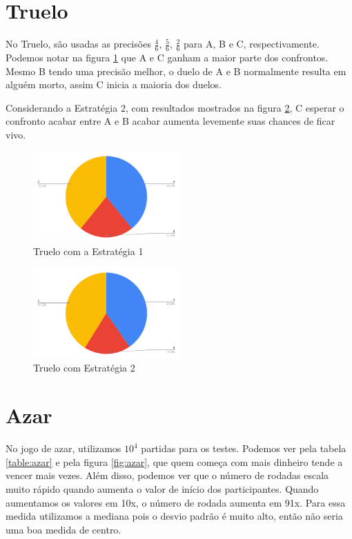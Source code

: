 \documentclass{report}
\begin{document}
\section{Truelo}

No Truelo, são usadas as precisões $\frac{4}{6}$, $\frac{5}{6}$, $\frac{2}{6}$ para A, B e C, 
respectivamente.
Podemos notar na figura \ref*{fig:t1} que A e C ganham a maior parte dos confrontos.
Mesmo B tendo uma precisão melhor, o duelo de A e B normalmente resulta em alguém morto,
assim C inicia a maioria dos duelos.

Considerando a Estratégia 2, com resultados mostrados na figura \ref{fig:t2}, C esperar
o confronto acabar entre A e B acabar aumenta levemente suas chances de ficar vivo.

\begin{figure}[h]
    \caption{Truelo com a Estratégia 1}
    \label{fig:t1}
    \centering
    \includegraphics[width=0.5\textwidth]{truelo-um.png}
    \end{figure}
\begin{figure}[h]
    \caption{Truelo com Estratégia 2}
    \label{fig:t2}
    \centering
    \includegraphics[width=0.5\textwidth]{truelo-dois.png}
    \end{figure}
\newpage

\section{Azar}

No jogo de azar, utilizamos $10^4$ partidas para os testes. Podemos ver pela tabela
\ref{table:azar} e pela figura \ref{fig:azar}, que quem começa com mais dinheiro tende a vencer mais vezes.
Além disso, podemos ver que o número de rodadas escala muito rápido quando aumenta
o valor de início dos participantes. Quando aumentamos os valores em 10x, o número
de rodada aumenta em 91x. Para essa medida utilizamos a mediana pois o desvio padrão
é muito alto, então não seria uma boa medida de centro.
\end{document}
